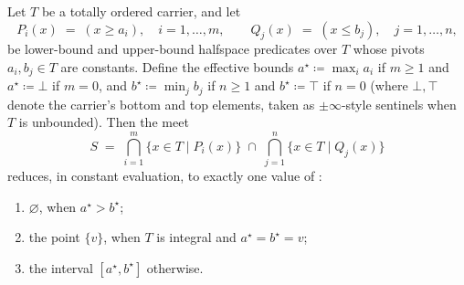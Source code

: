 \documentclass[11pt, a4paper]{article}
\begin{document}
\begin{theorem}
\label{thm:type-directed-collapse-1d}
Let $T$ be a totally ordered carrier, and let
\[
  P_i(x) \;=\; (x \ge a_i), \quad i = 1, \dots, m,
  \qquad
  Q_j(x) \;=\; (x \le b_j), \quad j = 1, \dots, n,
\]
be lower-bound and upper-bound halfspace predicates over $T$ whose
pivots $a_i, b_j \in T$ are constants. Define the effective bounds
$a^\star \coloneqq \max_i a_i$ if $m \ge 1$ and $a^\star \coloneqq
\bot$ if $m = 0$, and $b^\star \coloneqq \min_j b_j$ if $n \ge 1$
and $b^\star \coloneqq \top$ if $n = 0$ (where $\bot, \top$ denote
the carrier's bottom and top elements, taken as
$\pm\infty$-style sentinels when $T$ is unbounded). Then the meet
\[
  S \;=\; \bigcap_{i=1}^{m} \{x \in T \mid P_i(x)\}
        \;\cap\;
        \bigcap_{j=1}^{n} \{x \in T \mid Q_j(x)\}
\]
reduces, in constant evaluation, to exactly one value of
:
\begin{enumerate}
  \item $\varnothing$, when $a^\star > b^\star$;
  \item the point $\{v\}$, when $T$ is integral and
        $a^\star = b^\star = v$;
  \item the interval $[a^\star, b^\star]$ otherwise.
\end{enumerate}
\end{theorem}
\end{document}
